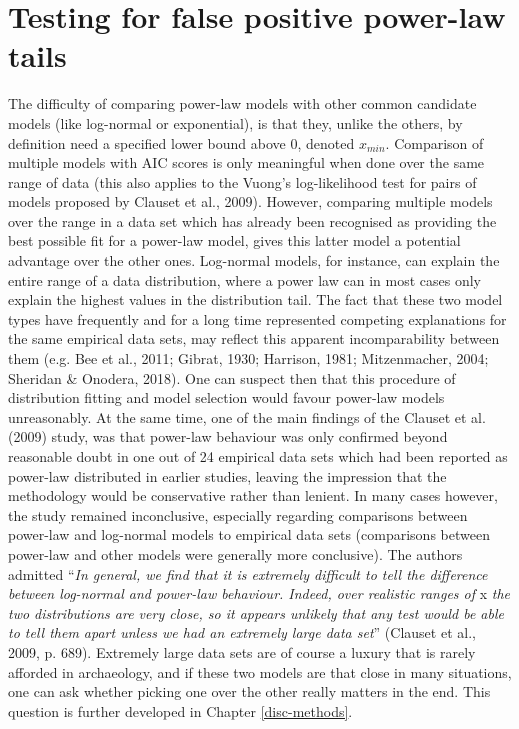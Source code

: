 \documentclass[
  12pt,
]{book}
\begin{document}
\hypertarget{testing-for-false-positive-power-law-tails}{%
\section{Testing for false positive power-law tails}\label{testing-for-false-positive-power-law-tails}}

The difficulty of comparing power-law models with other common candidate models (like log-normal or exponential), is that they, unlike the others, by definition need a specified lower bound above 0, denoted \(x_{min}\). Comparison of multiple models with AIC scores is only meaningful when done over the same range of data (this also applies to the Vuong's log-likelihood test for pairs of models proposed by Clauset et al., 2009). However, comparing multiple models over the range in a data set which has already been recognised as providing the best possible fit for a power-law model, gives this latter model a potential advantage over the other ones. Log-normal models, for instance, can explain the entire range of a data distribution, where a power law can in most cases only explain the highest values in the distribution tail. The fact that these two model types have frequently and for a long time represented competing explanations for the same empirical data sets, may reflect this apparent incomparability between them (e.g. Bee et al., 2011; Gibrat, 1930; Harrison, 1981; Mitzenmacher, 2004; Sheridan \& Onodera, 2018). One can suspect then that this procedure of distribution fitting and model selection would favour power-law models unreasonably. At the same time, one of the main findings of the Clauset et al. (2009) study, was that power-law behaviour was only confirmed beyond reasonable doubt in one out of 24 empirical data sets which had been reported as power-law distributed in earlier studies, leaving the impression that the methodology would be conservative rather than lenient. In many cases however, the study remained inconclusive, especially regarding comparisons between power-law and log-normal models to empirical data sets (comparisons between power-law and other models were generally more conclusive). The authors admitted ``\emph{In general, we find that it is extremely difficult to tell the difference between log-normal and power-law behaviour. Indeed, over realistic ranges of} x \emph{the two distributions are very close, so it appears unlikely that any test would be able to tell them apart unless we had an extremely large data set}'' (Clauset et al., 2009, p. 689). Extremely large data sets are of course a luxury that is rarely afforded in archaeology, and if these two models are that close in many situations, one can ask whether picking one over the other really matters in the end. This question is further developed in Chapter \ref{disc-methods}.
\end{document}
